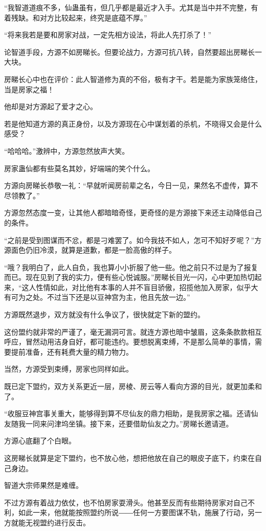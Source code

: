 \begin{this_body}
“我智道道痕不多，仙蛊虽有，但几乎都是最近才入手。尤其是当中并不完整，有着残缺。和对方比较起来，终究是底蕴不厚。”

“将来我若是要和房家对战，一定先相方设法，将此人先打杀了！”

论智道手段，方源不如房睇长。但要论战力，方源可抗八转，自然要超出房睇长一大块。

房睇长心中也在评价：此人智道修为真的不俗，极有才干。若是能为家族笼络住，当是房家之福！

他却是对方源起了爱才之心。

若是他知道方源的真正身份，以及方源现在心中谋划着的杀机，不晓得又会是什么感受？

“哈哈哈。”激辨中，方源忽然放声大笑。

房家蛊仙都有些莫名其妙，好端端的笑个什么。

方源向房睇长恭敬一礼：“早就听闻房前辈之名，今日一见，果然名不虚传，算不尽领教了。”

方源忽然态度一变，让其他人都暗暗奇怪，更奇怪的是方源接下来还主动降低自己的条件。

“之前是受到图谋而不忿，都是刁难罢了。如今我技不如人，怎可不知好歹呢？”方源面色仍旧冷漠，就算是道歉，都是一脸高傲的样子。

“哦？我明白了，此人自负，我也算小小折服了他一些。他之前只不过是为了报复而已。现在见到了我的实力，便有些心悦诚服。”房睇长目光一闪，心中更加热切起来，“这人性情如此，对比他有本事的人并不盲目骄傲，招揽他加入房家，似乎大有可为之处。不过当下还是以豆神宫为主，他且先放一边。”

方源既然退步，双方就没有什么争议了，很快就定下新的盟约。

这份盟约就非常的严谨了，毫无漏洞可言。就连方源也暗中皱眉，这条条款款相互呼应，冒然动用洁身自好，都可能违约。要想脱离束缚，不是那么简单的事情，需要提前准备，还有耗费大量的精力物力。

当然，方源受到束缚，房家也同样如此。

既已定下盟约，双方关系更近一层，房棱、房云等人看向方源的目光，就更加柔和了。

“收服豆神宫事关重大，能够得到算不尽仙友的鼎力相助，是我房家之福。还请仙友随我一同来问津坞坐镇。接下来，还要借助仙友之力。”房睇长邀请道。

方源心底翻了个白眼。

这房睇长就算是定下盟约，也不放心他，想把他放在自己的眼皮子底下，约束在自己身边。

智道大宗师果然是难缠。

不过方源有着战力依仗，也不怕房家耍滑头。他甚至反而有些期待房家对自己不利，如此一来，他就能按照盟约所说――任何一方要图谋不轨，施展了行动，另一方就能无视盟约进行反击。


\end{this_body}
